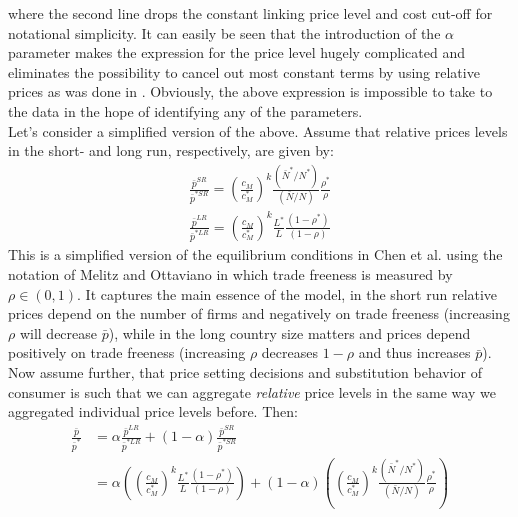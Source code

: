 \documentclass[a4paper,12pt]{article}
\begin{document}
where the second line drops the constant linking price level and cost cut-off for notational simplicity. It can easily be seen that the introduction of the $\alpha$ parameter makes the expression for the price level hugely complicated and eliminates the possibility to cancel out most constant terms by using relative prices as was done in \citet{Chen2009}. Obviously, the above expression is impossible to take to the data in the hope of identifying any of the parameters. \\
Let's consider a simplified version of the above. Assume that relative prices levels in the short- and long run, respectively, are given by:
\begin{align*}
\frac{\bar{p}^{SR}}{\bar{p}^{*SR}} = \left( \frac{c_M}{c_M^*} \right)^k \frac{(\bar{N}^* / N^*)}{(\bar{N} / N)} \frac{\rho^*}{\rho} \\
\frac{\bar{p}^{LR}}{\bar{p}^{*LR}} = \left( \frac{c_M}{c_M^*} \right)^k \frac{L^*}{L} \frac{(1-\rho^*)}{(1-\rho)}
\end{align*}
This is a simplified version of the equilibrium conditions in Chen et al. using the notation of Melitz and Ottaviano in which trade freeness is measured by $\rho \in (0,1)$. It captures the main essence of the model, in the short run relative prices depend on the number of firms and negatively on trade freeness (increasing $\rho$ will decrease $\bar{p}$), while in the long country size matters and prices depend positively on trade freeness (increasing $\rho$ decreases $1-\rho$ and thus increases $\bar{p}$). Now assume further, that price setting decisions and substitution behavior of consumer is such that we can aggregate \textit{relative} price levels in the same way we aggregated individual price levels before. Then:
\begin{align*}
\frac{\bar{p}}{\bar{p}^*} &= \alpha \frac{\bar{p}^{LR}}{\bar{p}^{*LR}} + (1-\alpha) \frac{\bar{p}^{SR}}{\bar{p}^{*SR}} \\
													&= \alpha \left( \left( \frac{c_M}{c_M^*} \right)^k \frac{L^*}{L} \frac{(1-\rho^*)}{(1-\rho)} \right) + (1-\alpha) \left( \left( \frac{c_M}{c_M^*} \right)^k \frac{(\bar{N}^* / N^*)}{(\bar{N} / N)} \frac{\rho^*}{\rho} \right)
\end{align*}
\end{document}
